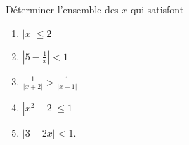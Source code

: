 

\begin{exercice}\label{exoINGE1114-0006}

	Déterminer l'ensemble des $x$ qui satisfont
	\begin{enumerate}

		\item
			$| x |\leq 2$
		\item
			$\left| 5-\frac{1}{ x } \right| <1$
		\item
			$\frac{1}{ | x+2 | }>\frac{1}{ | x-1 | }$
		\item
			$| x^2-2 |\leq 1$
		\item
			$| 3-2x |<1$.
	\end{enumerate}

\end{exercice}
